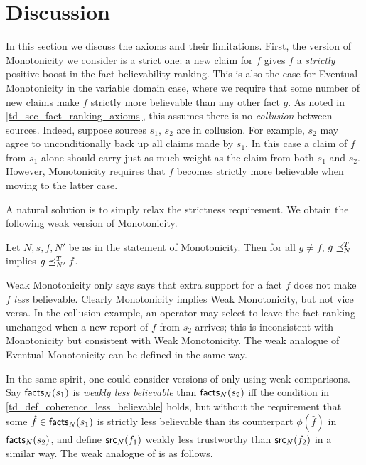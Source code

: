 \section{Discussion}
\label{td_sec_discussion}

In this section we discuss the axioms and their limitations.
%
First, the version of Monotonicity we consider is a strict one: a new claim for
$f$ gives $f$ a \emph{strictly} positive boost in the fact believability
ranking. This is also the case for Eventual Monotonicity in the variable domain
case, where we require that some number of new claims make $f$ strictly more
believable than any other fact $g$. As noted in \cref{td_sec_fact_ranking_axioms},
this assumes there is no \emph{collusion} between sources. Indeed, suppose
sources $s_1$, $s_2$ are in collusion. For example, $s_2$ may agree to
unconditionally back up all claims made by $s_1$. In this case a claim of $f$
from $s_1$ alone should carry just as much weight as the claim from both $s_1$
and $s_2$. However, Monotonicity requires that $f$ becomes strictly more
believable when moving to the latter case.

A natural solution is to simply relax the strictness requirement. We obtain the
following weak version of Monotonicity.

\begin{axiom}
Let $N, s, f, N'$ be as in the statement of Monotonicity. Then for all $g \ne
f$, $g \preceq_N^T$ implies $g \preceq_{N'}^T f$.
\end{axiom}

Weak Monotonicity only says says that extra support for a fact $f$ does not
make $f$ \emph{less} believable. Clearly Monotonicity implies Weak
Monotonicity, but not vice versa. In the collusion example, an operator may
select to leave the fact ranking unchanged when a new report of $f$ from $s_2$
arrives; this is inconsistent with Monotonicity but consistent with Weak
Monotonicity. The weak analogue of Eventual Monotonicity can be defined in the
same way.

In the same spirit, one could consider versions of \coherence{} only using weak
comparisons. Say $\mathsf{facts}_N(s_1)$ is \emph{weakly less believable} than
$\mathsf{facts}_N(s_2)$ iff the condition in \cref{td_def_coherence_less_believable}
holds, but without the requirement that some $\hat{f} \in \mathsf{facts}_N(s_1)$ is
strictly less believable than its counterpart $\phi(\hat{f})$ in
$\mathsf{facts}_N(s_2)$, and define $\mathsf{src}_N(f_1)$ weakly less trustworthy than
$\mathsf{src}_N(f_2)$ in a similar way. The weak analogue of \coherence{} is as follows.

